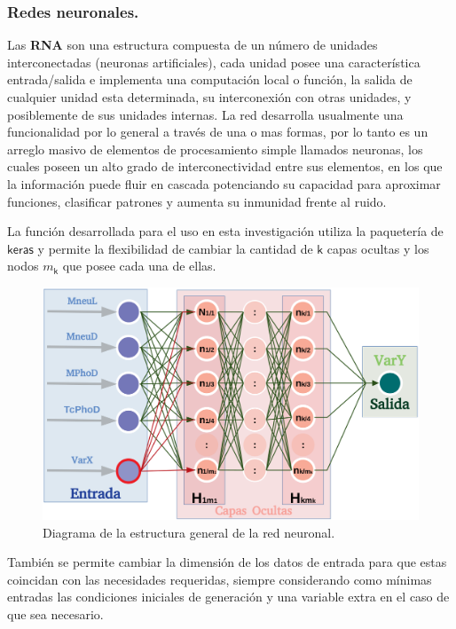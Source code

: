 \subsubsection{Redes neuronales.}
Las \textbf{RNA} son una estructura compuesta de un número de unidades interconectadas (neuronas artificiales), cada unidad posee una característica entrada/salida e implementa una computación local o función, la salida de cualquier unidad esta determinada, su interconexión con otras unidades, y posiblemente de sus unidades internas. La red desarrolla usualmente una funcionalidad por lo general a través de una o mas formas, por lo tanto es un arreglo masivo de elementos de procesamiento simple llamados neuronas, los cuales poseen un alto grado de interconectividad entre sus elementos, en los que la información puede fluir en cascada potenciando su capacidad para aproximar funciones, clasificar patrones y aumenta su inmunidad frente al ruido. 

La función desarrollada para el uso en esta investigación utiliza la paquetería de $\textsf{keras}$ y permite la flexibilidad de cambiar la cantidad de $\textsf{k}$ capas ocultas y los nodos $m_\textsf{k}$ que posee cada una de ellas.



\begin{figure}[!h]
\centering
\includegraphics[width=1\textwidth]{Simulacion/imagenes/neuronas.png}
\caption{Diagrama de la estructura general de la red neuronal.}
\label{neuronas}
\end{figure}

También se permite cambiar la dimensión de los datos de entrada para que estas coincidan con las necesidades requeridas, siempre considerando como mínimas entradas las condiciones iniciales de generación y una variable extra en el caso de que sea necesario.

